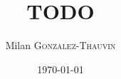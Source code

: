 








%


\title[TODO]{TODO}
\author{Milan \textsc{Gonzalez-Thauvin}}
\date{\today} %



\begin{frame}
	\titlepage{}
\end{frame}





